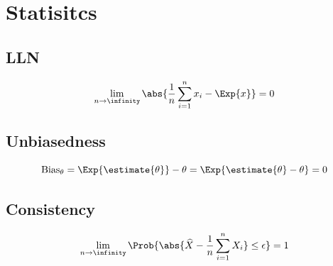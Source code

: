 \documentclass[18pt,a3paper,landscape, ncols=3]{cheatsheet}
\begin{document}

\section{Statisitcs} \seperator
	\subsection{LLN}
		\begin{mdframed}
			\[
				\lim_{n \rightarrow \infinity} \abs{\frac{1}{n} \sum_{i=1}^{n} x_i - \Exp{x}} = 0
			\]
		\end{mdframed}
	\subsection{Unbiasedness}
		\begin{mdframed}
			\[
				\mathrm{Bias}_{\theta} = \Exp{\estimate{\theta}} - \theta = \Exp{\estimate{\theta} - \theta} = 0
			\]
		\end{mdframed}
	\subsection{Consistency}
		\begin{mdframed}
			\[
				\lim_{n \rightarrow \infinity} \Prob{ \abs{\widehat{X} - \frac{1}{n}\sum_{i=1}^{n} X_i} \leq \epsilon} = 1
			\]
		\end{mdframed}
\end{document}
